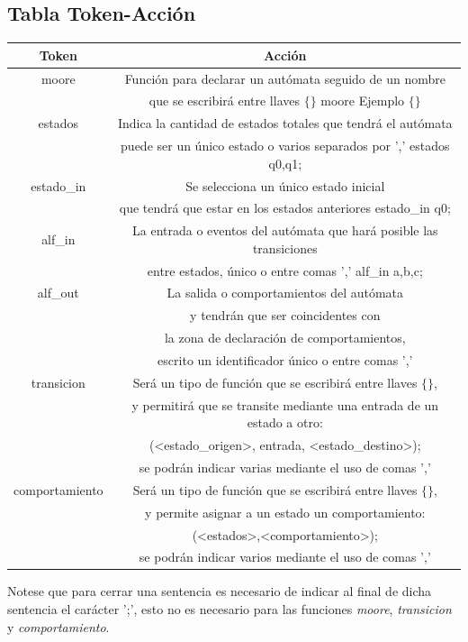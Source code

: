 \documentclass[12pt,a4paper]{article}
\begin{document}
{\subsection{Tabla Token-Acción}
\clearpage
\begin{center}
\begin{tabular}{|c|c|}
	\hline 
	\textbf{Token} & \textbf{Acción} \\ 
	\hline 
	moore & Función para declarar un autómata seguido de un nombre   \\
	& que se escribirá entre llaves $\{\}$ moore Ejemplo $\{\}$\\
	\hline 
	estados & Indica la cantidad de estados totales que tendrá el autómata  \\
	& puede ser un único estado o varios separados por ',' estados q0,q1;\\ 
	\hline 
	estado\_in & Se selecciona un único estado inicial  \\ 
	& que tendrá que estar en los estados anteriores estado\_in q0; \\
	\hline 
	alf\_in & La entrada o eventos del autómata que hará posible las transiciones\\
	& entre estados, único o entre comas ',' alf\_in a,b,c;\\
	\hline 
	alf\_out &  La salida o comportamientos del autómata  \\
	& y tendrán que ser coincidentes con \\ 
	& la zona de declaración de comportamientos, \\
	&  escrito un identificador único o entre comas ',' \\
	\hline
	transicion & Será un tipo de función que se escribirá entre llaves $\{\}$, \\
	& y permitirá que se transite mediante una entrada de un estado a otro: \\ 
	& (<estado\_origen>, entrada, <estado\_destino>); \\
	& se podrán indicar varias mediante el uso de comas ',' \\
	\hline 
	comportamiento & Será un tipo de función que se escribirá entre llaves $\{\}$,   \\ 
	& y permite asignar a un estado un comportamiento: \\
	& (<estados>,<comportamiento>); \\
	& se podrán indicar varios mediante el uso de comas ','\\
	\hline  
\end{tabular} 
\end{center}
Notese que para cerrar una sentencia es necesario de indicar al final de dicha sentencia el carácter ';', esto no es necesario para las funciones \textit{moore}, \textit{transicion} y \textit{comportamiento}.
}
\end{document}
